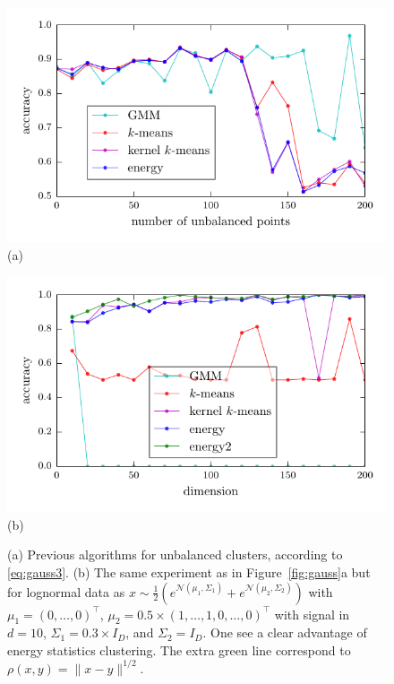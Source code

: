 \documentclass[aps,preprint,nofootinbib,floatfix]{revtex4-1}
\begin{document}
\begin{figure}
\begin{minipage}{0.49\textwidth}
\centering
\includegraphics[width=1\textwidth]{gauss_pi.pdf}\\[-.8em]
(a)
\end{minipage}
\begin{minipage}{0.49\textwidth}
\centering
\includegraphics[width=1\textwidth]{loggauss_dim.pdf}\\[-.8em]
(b)
\end{minipage}
\caption{
\label{fig:unbalanced}
(a) Previous algorithms for unbalanced clusters, 
according to \eqref{eq:gauss3}.
(b) The same experiment as in Figure~\ref{fig:gauss}a but for lognormal
data as 
$x\sim \tfrac{1}{2}\left( e^{\mathcal{N}(\mu_1,\Sigma_1)} +
e^{\mathcal{N}(\mu_2,\Sigma_2)} \right)$ with
$\mu_1 = (0,\dotsc,0)^\top$,
$\mu_2 = 0.5\times(1,\dotsc,1,0,\dotsc,0)^\top$ with signal in $d=10$, 
$\Sigma_1 = 0.3 \times I_D$, and $\Sigma_2=I_D$. 
One see a clear advantage of
energy statistics clustering. The extra green line correspond
to $\rho(x,y) = \| x-y\|^{1/2}$.
}
\end{figure}
\end{document}
